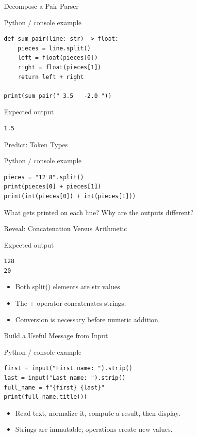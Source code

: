 \documentclass[aspectratio=169,10pt]{beamer}
\begin{document}
\begin{frame}[fragile]{Decompose a Pair Parser}
\begin{block}{Python / console example}\begin{Verbatim}[fontsize=\footnotesize]
def sum_pair(line: str) -> float:
    pieces = line.split()
    left = float(pieces[0])
    right = float(pieces[1])
    return left + right

print(sum_pair(" 3.5   -2.0 "))
\end{Verbatim}
\end{block}
\begin{block}{Expected output}\begin{Verbatim}[fontsize=\footnotesize]
1.5
\end{Verbatim}
\end{block}
\end{frame}
\begin{frame}[fragile]{Predict: Token Types}
\begin{block}{Python / console example}\begin{Verbatim}[fontsize=\footnotesize]
pieces = "12 8".split()
print(pieces[0] + pieces[1])
print(int(pieces[0]) + int(pieces[1]))
\end{Verbatim}
\end{block}
\begin{activity}What gets printed on each line? Why are the outputs different?\end{activity}
\end{frame}
\begin{frame}[fragile]{Reveal: Concatenation Versus Arithmetic}
\begin{block}{Expected output}\begin{Verbatim}[fontsize=\footnotesize]
128
20
\end{Verbatim}
\end{block}
\begin{itemize}
\item Both split() elements are str values.
\item The + operator concatenates strings.
\item Conversion is necessary before numeric addition.
\end{itemize}
\end{frame}
\begin{frame}[fragile]{Build a Useful Message from Input}
\begin{block}{Python / console example}\begin{Verbatim}[fontsize=\footnotesize]
first = input("First name: ").strip()
last = input("Last name: ").strip()
full_name = f"{first} {last}"
print(full_name.title())
\end{Verbatim}
\end{block}
\begin{itemize}
\item Read text, normalize it, compute a result, then display.
\item Strings are immutable; operations create new values.
\end{itemize}
\end{frame}
\end{document}
